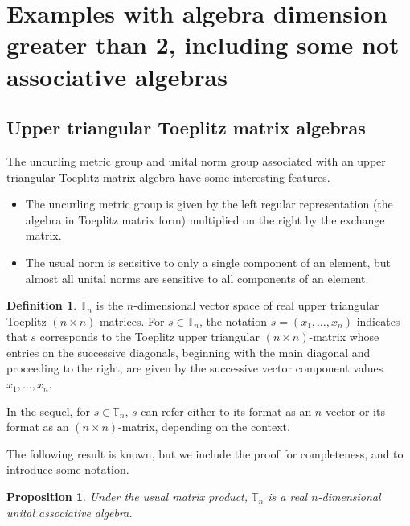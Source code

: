 \documentclass{amsart}
\numberwithin{equation}{section}
\newtheorem{proposition}[theorem]{Proposition}
\theoremstyle{definition}
\newtheorem{definition}[theorem]{Definition}
\numberwithin{theorem}{section}
\begin{document}
\section{Examples with algebra dimension greater than 2, including some not associative algebras}
\subsection{Upper triangular Toeplitz matrix algebras}

The uncurling metric group and unital norm group associated with an upper triangular Toeplitz matrix algebra have some interesting features.
\begin{itemize}\item The uncurling metric group is given by the left regular representation (the algebra in Toeplitz matrix form) multiplied on the right by the exchange matrix. \item The usual norm is sensitive to only a single component of an element, but almost all unital norms are sensitive to all components of an element.\end{itemize}
 
 \begin{definition}\label{5/4/22.1} $\mathbb{T}_n$ is the $n$-dimensional vector space of real upper triangular Toeplitz $(n\times n)$-matrices. For $s\in \mathbb{T}_n$, the notation $s=(x_1,\dots,x_n)$ indicates that $s$ corresponds to the Toeplitz upper triangular $(n\times n)$-matrix whose entries on the successive diagonals, beginning with the main diagonal and proceeding to the right, are given by the successive vector component values $x_1,\dots,x_n$.   
\end{definition}

In the sequel, for $s\in \mathbb{T}_n$, $s$ can refer either to its format as an $n$-vector or its format as an $(n\times n)$-matrix, depending on the context.

The following result is known, but we include the proof for completeness, and to introduce some notation.  
 \begin{proposition}\label{5/10/22.1} Under the usual matrix product, $\mathbb{T}_n$ is a real $n$-dimensional unital associative algebra.\end{proposition} 
 
\end{document}
